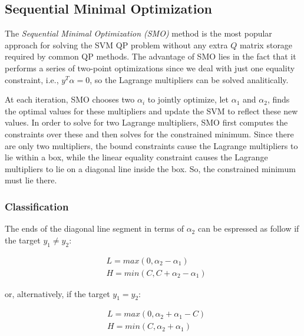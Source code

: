 \pagebreak

\subsection{Sequential Minimal Optimization}

The \emph{Sequential Minimal Optimization (SMO)} \cite{platt1998sequential} method is the most popular approach for solving the SVM QP problem without any extra $Q$ matrix storage required by common QP methods. The advantage of SMO lies in the fact that it performs a series of two-point optimizations since we deal with just one equality constraint, i.e., $y^T \alpha=0$, so the Lagrange multipliers can be solved analitically.

At each iteration, SMO chooses two $\alpha_i$ to jointly optimize, let $\alpha_1$ and $\alpha_2$, finds the optimal values for these multipliers and update the SVM to reflect these new values. In order to solve for two Lagrange multipliers, SMO first computes the constraints over these and then solves for the constrained minimum. Since there are only two multipliers, the bound constraints cause the Lagrange multipliers to lie within a box, while the linear equality constraint causes the Lagrange multipliers to lie on a diagonal line inside the box. So, the constrained minimum must lie there.

\subsubsection{Classification}

The ends of the diagonal line segment in terms of $\alpha_2$ can be espressed as follow if the target $y_1 \ne y_2$:

\begin{equation} \label{eq:bounds_update1}
	\begin{aligned}
		& L = max(0, \alpha_2 - \alpha_1) \\
		& H = min(C, C + \alpha_2 - \alpha_1)
	\end{aligned}
\end{equation}

or, alternatively, if the target $y_1 = y_2$:

\begin{equation} \label{eq:bounds_update2}
	\begin{aligned}
		& L = max(0, \alpha_2 + \alpha_1 - C) \\
		& H = min(C, \alpha_2 + \alpha_1)
	\end{aligned}
\end{equation}

